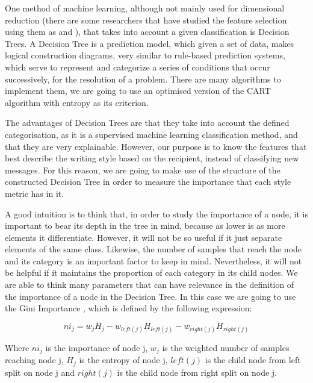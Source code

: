 One method of machine learning, although not mainly used for dimensional reduction (there are some researchers that have studied the feature selection using them as \cite{sugumaran2007feature} and \cite{cho2011decision}), that takes into account a given classification is Decision Trees. A Decision Tree \citep{rokach2008data} is a prediction model, which given a set of data, makes logical construction diagrams, very similar to rule-based prediction systems, which serve to represent and categorize a series of conditions that occur successively, for the resolution of a problem. There are many algorithms to implement them, we are going to use an optimised version of the CART algorithm \citep{breiman1984classification} with entropy as its criterion.

The advantages of Decision Trees are that they take into account the defined categorisation, as it is a supervised machine learning classification method, and that they are very explainable. However, our purpose is to know the features that best describe the writing style based on the recipient, instead of classifying new messages. For this reason, we are going to make use of the structure of the constructed Decision Tree in order to measure the importance that each style metric has in it.

A good intuition is to think that, in order to study the importance of a node, it is important to bear its depth in the tree in mind, because as lower is as more elements it differentiate. However, it will not be so useful if it just separate elements of the same class. Likewise, the number of samples that reach the node and its category is an important factor to keep in mind. Nevertheless, it will not be helpful if it maintains the proportion of each category in its child nodes. We are able to think many parameters that can have relevance in the definition of the importance of a node in the Decision Tree. In this case we are going to use the Gini Importance \citep{breiman2001random}, which is defined by the following expression:

$$
ni_j = w_jH_j - w_{left(j)}H_{left(j)} - w_{right(j)}H_{right(j)}
$$

Where $ni_j$ is the importance of node j, $w_j$ is the weighted number of samples reaching node j, $H_j$ is the entropy of node j, $left(j)$ is the child node from left split on node j and $right(j)$ is the child node from right split on node j.